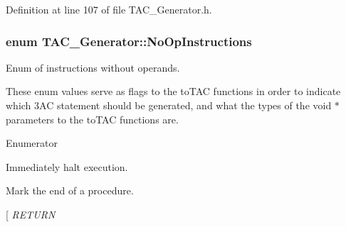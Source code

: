 Definition at line 107 of file T\-A\-C\-\_\-\-Generator.\-h.

\hypertarget{classTAC__Generator_a3942f3e280fb83e44ad85eb13d56dfb5}{
\subsubsection[{No\-Op\-Instructions}]{\setlength{\rightskip}{0pt plus 5cm}enum {\bf T\-A\-C\-\_\-\-Generator\-::\-No\-Op\-Instructions}}}\label{classTAC__Generator_a3942f3e280fb83e44ad85eb13d56dfb5}


Enum of instructions without operands. 

These enum values serve as flags to the to\-T\-A\-C functions in order to indicate which 3\-A\-C statement should be generated, and what the types of the void $\ast$ parameters to the to\-T\-A\-C functions are. \begin{Desc}
\item[Enumerator]\par
\begin{description}
\item[{\em 
\hypertarget{classTAC__Generator_a3942f3e280fb83e44ad85eb13d56dfb5a8e16b137fe321cada85cb3ab596934f7}{H\-A\-L\-T}\label{classTAC__Generator_a3942f3e280fb83e44ad85eb13d56dfb5a8e16b137fe321cada85cb3ab596934f7}
}]Immediately halt execution. \item[{\em 
\hypertarget{classTAC__Generator_a3942f3e280fb83e44ad85eb13d56dfb5ab8cc9678456e68db56838ba762eb03cf}{E\-N\-D\-P\-R\-O\-C}\label{classTAC__Generator_a3942f3e280fb83e44ad85eb13d56dfb5ab8cc9678456e68db56838ba762eb03cf}
}]Mark the end of a procedure. \item[{\em 
\hypertarget{classTAC__Generator_a3942f3e280fb83e44ad85eb13d56dfb5a0e868fa94bac0750a62dfa98d0f56510}{R\-E\-T\-U\-R\-N}\label{classTAC__Generator_a3942f3e280fb83e44ad85eb13d56dfb5a0e868fa94bac0750a62dfa98d0f56510}
}
\end{description}
\end{Desc}
